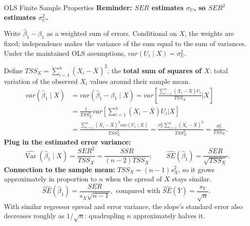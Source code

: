 \documentclass[notes,10pt, aspectratio=169]{beamer}
\begin{document}
\begin{frame}{OLS Finite Sample Properties}
\scriptsize
\setlength{\abovedisplayskip}{3pt}
\setlength{\belowdisplayskip}{3pt}
\textbf{Reminder: $SER$ estimates $\sigma_U$, so $SER^2$ estimates $\sigma_U^2$.}
\par\smallskip
Write $\hat\beta_1-\beta_1$ as a weighted sum of errors. Conditional on $X$, the weights are fixed; independence makes the variance of the sum equal to the sum of variances. Under the maintained OLS assumptions, $var(U_i\mid X)=\sigma_U^2$.
\par\smallskip
Define $TSS_X=\sum_{i=1}^n(X_i-\overline X)^2$, the \textbf{total sum of squares of $X$}: total variation of the observed $X_i$ values around their sample mean.
\[
\begin{aligned}
var(\hat\beta_1\mid X)
&=var(\hat\beta_1-\beta_1\mid X)
=var\left[\frac{\sum_{i=1}^n(X_i-\overline X)U_i}{TSS_X}\Bigg|X\right]\\
&=\frac{1}{TSS_X^2}var\left[\sum_{i=1}^n(X_i-\overline X)U_i\Bigg|X\right]\\
&=\frac{\sum_{i=1}^n(X_i-\overline X)^2var(U_i\mid X)}{TSS_X^2}
=\frac{\sigma_U^2\sum_{i=1}^n(X_i-\overline X)^2}{TSS_X^2}
=\frac{\sigma_U^2}{TSS_X}.
\end{aligned}
\]
\textbf{Plug in the estimated error variance:}
\[
\widehat{\operatorname{Var}}(\hat\beta_1\mid X)
=\frac{SER^2}{TSS_X}
=\frac{SSR}{(n-2)TSS_X};
\qquad
\widehat{SE}(\hat\beta_1)=\frac{SER}{\sqrt{TSS_X}}.
\]
\textbf{Connection to the sample mean:} $TSS_X=(n-1)s_X^2$, so it grows approximately in proportion to $n$ when the spread of $X$ stays similar.
\[
\widehat{SE}(\hat\beta_1)=\frac{SER}{s_X\sqrt{n-1}},
\text{ compared with }\widehat{SE}(\overline Y)=\frac{s_Y}{\sqrt n}.
\]
With similar regressor spread and error variance, the slope's standard error also decreases roughly as $1/\sqrt n$: quadrupling $n$ approximately halves it.
\end{frame}

\end{document}
